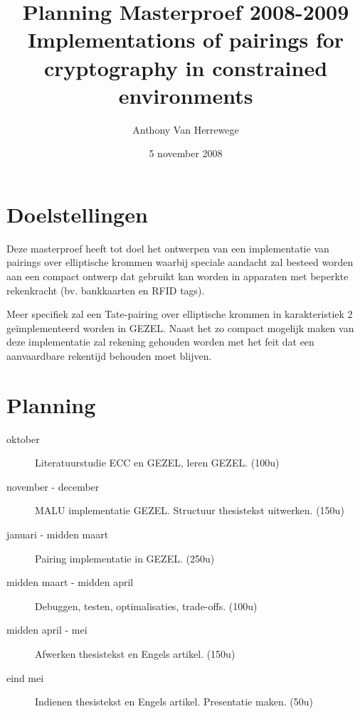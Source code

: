 \documentclass[a4paper]{article}
\title{\LARGE Planning Masterproef 2008-2009\\\Large Implementations of pairings for cryptography in constrained environments}
\author{Anthony Van Herrewege}
\date{5 november 2008}
\begin{document}
\maketitle

\section*{Doelstellingen}

Deze masterproef heeft tot doel het ontwerpen van een implementatie van pairings over elliptische krommen waarbij speciale aandacht zal besteed worden aan een compact ontwerp dat gebruikt kan worden in apparaten met beperkte rekenkracht (bv. bankkaarten en RFID tags).

Meer specifiek zal een Tate-pairing over elliptische krommen in karakteristiek 2 ge\"implementeerd worden in GEZEL. Naast het zo compact mogelijk maken van deze implementatie zal rekening gehouden worden met het feit dat een aanvaardbare rekentijd behouden moet blijven.

\section*{Planning}

\begin{description}
	\item[oktober] Literatuurstudie ECC en GEZEL, leren GEZEL. (100u)
	\item[november - december] MALU implementatie GEZEL. Structuur thesistekst uitwerken. (150u)
	\item[januari - midden maart] Pairing implementatie in GEZEL. (250u)
	\item[midden maart - midden april] Debuggen, testen, optimalisaties, trade-offs. (100u)
	\item[midden april - mei] Afwerken thesistekst en Engels artikel. (150u)
	\item[eind mei] Indienen thesistekst en Engels artikel. Presentatie maken. (50u)
\end{description}
\end{document}
